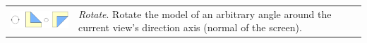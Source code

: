 \begin{savenotes}
\begin{longtable}{lp{9cm}}
\includegraphics[width=4cm]{images/folds_rotate} & \emph{Rotate}. Rotate the model of an arbitrary angle around the current view's direction axis (normal of the screen).\\
\end{longtable}
\end{savenotes}
